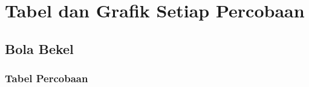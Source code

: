 



% 





\chapter{Tabel dan Grafik Setiap Percobaan}
\section{Bola Bekel}
\subsection{Tabel Percobaan}






















